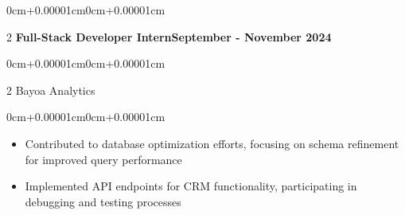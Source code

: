 \documentclass[11pt, letterpaper]{article}
\newenvironment{highlights}{\begin{itemize}[topsep=0.08cm,parsep=0.08cm,partopsep=0pt,itemsep=0pt,leftmargin=0cm+10pt]}{\end{itemize}}
\newenvironment{onecolentry}{\begin{adjustwidth}{0cm+0.00001cm}{0cm+0.00001cm}}{\end{adjustwidth}}
\newenvironment{twocolentry}[2][]{\onecolentry\def\secondColumn{#2}\setcolumnwidth{\fill,5.2cm}\begin{paracol}{2}}{\switchcolumn \raggedleft \secondColumn\end{paracol}\endonecolentry}
\begin{document}
    \begin{twocolentry}{\textbf{September - November 2024}}
    \textbf{Full-Stack Developer Intern}\end{twocolentry}
    \vspace{0.05cm}
    \begin{twocolentry}{}
    Bayoa Analytics\end{twocolentry}
    \vspace{0.10cm}
    \begin{onecolentry}
        \begin{highlights}
            \item Contributed to database optimization efforts, focusing on schema refinement for improved query performance
            \item Implemented API endpoints for CRM functionality, participating in debugging and testing processes
        \end{highlights}
    \end{onecolentry}
    \vspace{0.15cm}
\end{document}

